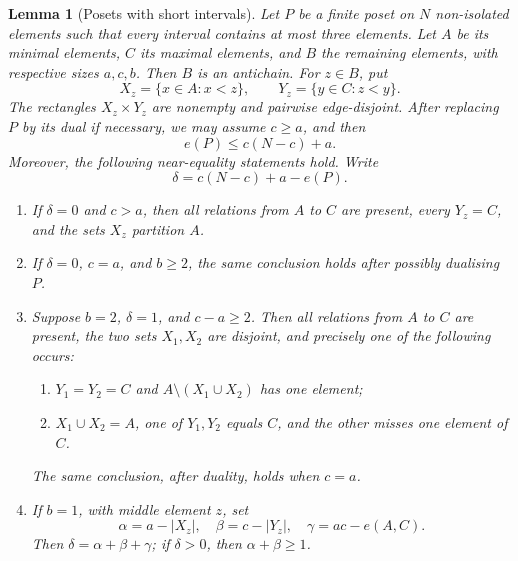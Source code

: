 \documentclass[11pt]{amsart}
\newtheorem{lemma}[theorem]{Lemma}
\theoremstyle{definition}
\begin{document}
\begin{lemma}[Posets with short intervals]\label{lem:poset}
Let $P$ be a finite poset on $N$ non-isolated elements such that every
interval contains at most three elements.  Let $A$ be its minimal elements,
$C$ its maximal elements, and $B$ the remaining elements, with respective
sizes $a,c,b$.  Then $B$ is an antichain.  For $z\in B$, put
\[
 X_z=\{x\in A:x<z\},
 \qquad
 Y_z=\{y\in C:z<y\}.
\]
The rectangles $X_z\times Y_z$ are nonempty and pairwise edge-disjoint.
After replacing $P$ by its dual if necessary, we may assume $c\ge a$, and
then
\begin{equation}\label{eq:poset-bound}
 e(P)\le c(N-c)+a.
\end{equation}
Moreover, the following near-equality statements hold.  Write
\[
 \delta=c(N-c)+a-e(P).
\]
\begin{enumerate}[label=\textup{(\roman*)},leftmargin=2.4em]
\item If $\delta=0$ and $c>a$, then all relations from $A$ to $C$ are
present, every $Y_z=C$, and the sets $X_z$ partition $A$.
\item If $\delta=0$, $c=a$, and $b\ge2$, the same conclusion holds after
possibly dualising $P$.
\item Suppose $b=2$, $\delta=1$, and $c-a\ge2$.  Then all relations from
$A$ to $C$ are present, the two sets $X_1,X_2$ are disjoint, and precisely
one of the following occurs:
\begin{enumerate}[label=\textup{(\alph*)}]
\item $Y_1=Y_2=C$ and $A\setminus(X_1\cup X_2)$ has one element;
\item $X_1\cup X_2=A$, one of $Y_1,Y_2$ equals $C$, and the other misses
one element of $C$.
\end{enumerate}
The same conclusion, after duality, holds when $c=a$.
\item If $b=1$, with middle element $z$, set
\[
 \alpha=a-|X_z|,
 \quad \beta=c-|Y_z|,
 \quad \gamma=ac-e(A,C).
\]
Then $\delta=\alpha+\beta+\gamma$; if $\delta>0$, then
$\alpha+\beta\ge1$.
\end{enumerate}
\end{lemma}
\end{document}
